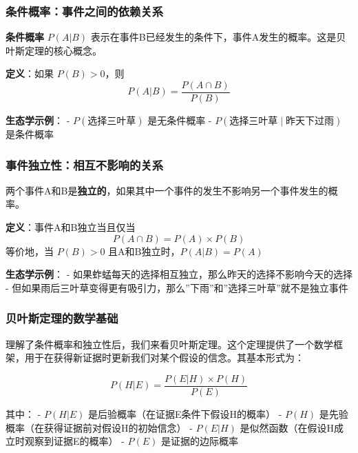 \documentclass[
  twoside]{book}
\begin{document}
\hypertarget{ux6761ux4ef6ux6982ux7387ux4e8bux4ef6ux4e4bux95f4ux7684ux4f9dux8d56ux5173ux7cfb}{%
\subsubsection{条件概率：事件之间的依赖关系}\label{ux6761ux4ef6ux6982ux7387ux4e8bux4ef6ux4e4bux95f4ux7684ux4f9dux8d56ux5173ux7cfb}}

\textbf{条件概率} \(P(A|B)\) 表示在事件B已经发生的条件下，事件A发生的概率。这是贝叶斯定理的核心概念。

\textbf{定义}：如果 \(P(B) > 0\)，则
\[P(A|B) = \frac{P(A \cap B)}{P(B)}\]

\textbf{生态学示例}：
- \(P(\text{选择三叶草})\) 是无条件概率
- \(P(\text{选择三叶草} \mid \text{昨天下过雨})\) 是条件概率

\hypertarget{ux4e8bux4ef6ux72ecux7acbux6027ux76f8ux4e92ux4e0dux5f71ux54cdux7684ux5173ux7cfb}{%
\subsubsection{事件独立性：相互不影响的关系}\label{ux4e8bux4ef6ux72ecux7acbux6027ux76f8ux4e92ux4e0dux5f71ux54cdux7684ux5173ux7cfb}}

两个事件A和B是\textbf{独立的}，如果其中一个事件的发生不影响另一个事件发生的概率。

\textbf{定义}：事件A和B独立当且仅当
\[P(A \cap B) = P(A) \times P(B)\]
等价地，当 \(P(B) > 0\) 且A和B独立时，\(P(A|B) = P(A)\)

\textbf{生态学示例}：
- 如果蚱蜢每天的选择相互独立，那么昨天的选择不影响今天的选择
- 但如果雨后三叶草变得更有吸引力，那么''下雨''和''选择三叶草''就不是独立事件

\hypertarget{ux8d1dux53f6ux65afux5b9aux7406ux7684ux6570ux5b66ux57faux7840}{%
\subsubsection{贝叶斯定理的数学基础}\label{ux8d1dux53f6ux65afux5b9aux7406ux7684ux6570ux5b66ux57faux7840}}

理解了条件概率和独立性后，我们来看贝叶斯定理。这个定理提供了一个数学框架，用于在获得新证据时更新我们对某个假设的信念。其基本形式为：

\[P(H|E) = \frac{P(E|H) \times P(H)}{P(E)}\]

其中：
- \(P(H|E)\) 是后验概率（在证据E条件下假设H的概率）
- \(P(H)\) 是先验概率（在获得证据前对假设H的初始信念）
- \(P(E|H)\) 是似然函数（在假设H成立时观察到证据E的概率）
- \(P(E)\) 是证据的边际概率
\end{document}
